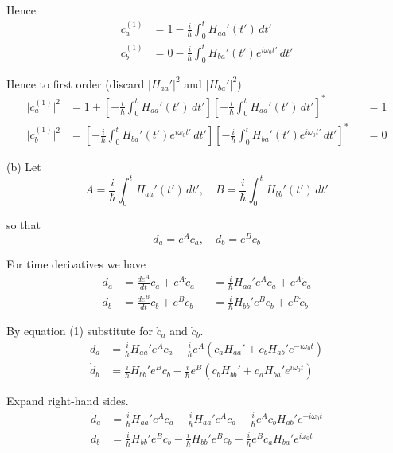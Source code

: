Hence
\begin{align*}
c_a^{(1)}&=1-\frac{i}{\hbar}\int_0^tH_{aa}'(t')\,dt'
\\
c_b^{(1)}&=0-\frac{i}{\hbar}\int_0^tH_{ba}'(t')e^{i\omega_0t'}\,dt'
\end{align*}

Hence to first order (discard $|H_{aa}'|^2$ and $|H_{ba}'|^2$)
\begin{align*}
\bigl|c_a^{(1)}\bigr|^2&=1+\left[-\frac{i}{\hbar}\int_0^tH_{aa}'(t')\,dt'\right]
\left[-\frac{i}{\hbar}\int_0^tH_{aa}'(t')\,dt'\right]^*
& {}&=1
\\
\bigl|c_b^{(1)}\bigr|^2&=\left[-\frac{i}{\hbar}\int_0^tH_{ba}'(t')e^{i\omega_0t'}\,dt'\right]
\left[-\frac{i}{\hbar}\int_0^tH_{ba}'(t')e^{i\omega_0t'}\,dt'\right]^*
& {}&=0
\end{align*}

(b) Let
\begin{equation*}
A=\frac{i}{\hbar}\int_0^tH_{aa}'(t')\,dt',\quad
B=\frac{i}{\hbar}\int_0^tH_{bb}'(t')\,dt'
\end{equation*}

so that
\begin{equation*}
d_a=e^Ac_a,\quad d_b=e^Bc_b
\tag{2}
\end{equation*}

For time derivatives we have
\begin{align*}
\dot d_a&=\frac{de^A}{dt}c_a+e^A\dot c_a&&=\frac{i}{\hbar}H_{aa}'e^Ac_a+e^A\dot c_a
\\
\dot d_b&=\frac{de^B}{dt}c_b+e^B\dot c_b&&=\frac{i}{\hbar}H_{bb}'e^Bc_b+e^B\dot c_b
\end{align*}

By equation (1) substitute for $\dot c_a$ and $\dot c_b$.
\begin{align*}
\dot d_a&=\frac{i}{\hbar}H_{aa}'e^Ac_a
-\frac{i}{\hbar}e^A\left(c_aH_{aa}'+c_bH_{ab}'e^{-i\omega_0t}\right)
\\
\dot d_b&=\frac{i}{\hbar}H_{bb}'e^Bc_b
-\frac{i}{\hbar}e^B\left(c_bH_{bb}'+c_aH_{ba}'e^{i\omega_0t}\right)
\end{align*}

Expand right-hand sides.
\begin{align*}
\dot d_a&=\frac{i}{\hbar}H_{aa}'e^Ac_a
-\frac{i}{\hbar}H_{aa}'e^Ac_a
-\frac{i}{\hbar}e^Ac_bH_{ab}'e^{-i\omega_0t}
\\
\dot d_b&=\frac{i}{\hbar}H_{bb}'e^Bc_b
-\frac{i}{\hbar}H_{bb}'e^Bc_b
-\frac{i}{\hbar}e^Bc_aH_{ba}'e^{i\omega_0t}
\end{align*}

